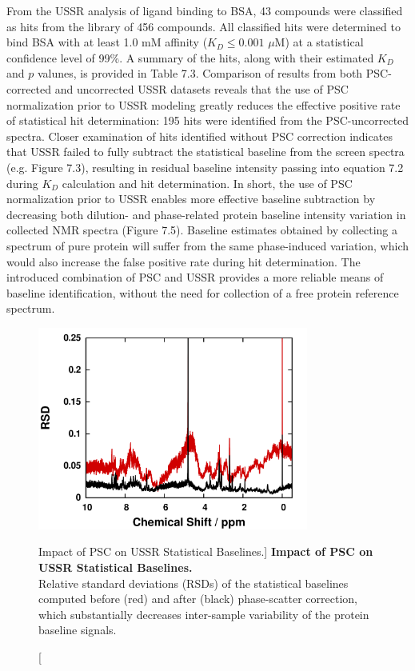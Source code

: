 \begin{doublespace}
From the USSR analysis of ligand binding to BSA, 43 compounds were classified
as hits from the library of 456 compounds. All classified hits were determined
to bind BSA with at least 1.0 mM affinity ($K_D \le 0.001$ $\mu$M) at a
statistical confidence level of 99\%. A summary of the hits, along with their
estimated $K_D$ and $p$ valunes, is provided in Table 7.3. Comparison of
results from both PSC-corrected and uncorrected USSR datasets reveals that the
use of PSC normalization prior to USSR modeling greatly reduces the effective
positive rate of statistical hit determination: 195 hits were identified from
the PSC-uncorrected spectra. Closer examination of hits identified without PSC
correction indicates that USSR failed to fully subtract the statistical
baseline from the screen spectra (e.g. Figure 7.3), resulting in residual
baseline intensity passing into equation 7.2 during $K_D$ calculation and hit
determination. In short, the use of PSC normalization prior to USSR enables
more effective baseline subtraction by decreasing both dilution- and
phase-related protein baseline intensity variation in collected \hnmr{} NMR
spectra (Figure 7.5). Baseline estimates obtained by collecting a spectrum of
pure protein will suffer from the same phase-induced variation, which would
also increase the false positive rate during hit determination. The introduced
combination of PSC and USSR provides a more reliable means of baseline
identification, without the need for collection of a free protein reference
spectrum.
\end{doublespace}

\begin{figure}
\includegraphics[width=3.5in]{figs/ussr/05-rsd.png}
\caption
      [Impact of PSC on USSR Statistical Baselines.]{
  {\bf Impact of PSC on USSR Statistical Baselines.}
  \\
  Relative standard deviations (RSDs) of the statistical baselines computed
  before (red) and after (black) phase-scatter correction, which substantially
  decreases inter-sample variability of the protein baseline signals.
}
\end{figure}

